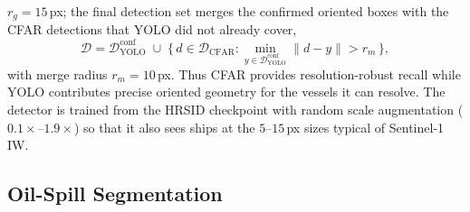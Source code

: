 \documentclass[a4paper,11pt]{article}
\begin{document}
$r_g=15$\,px; the final detection set merges the confirmed oriented boxes with the CFAR
detections that YOLO did not already cover,
\begin{equation}
\mathcal{D} = \mathcal{D}_{\text{YOLO}}^{\text{conf}} \;\cup\;
\{\,d \in \mathcal{D}_{\text{CFAR}} : \min_{y\in\mathcal{D}_{\text{YOLO}}^{\text{conf}}}
\lVert d - y\rVert > r_m\,\},
\end{equation}
with merge radius $r_m=10$\,px. Thus CFAR provides resolution-robust recall while YOLO
contributes precise oriented geometry for the vessels it can resolve. The detector is
trained from the HRSID checkpoint with random scale augmentation ($0.1\times$--$1.9\times$)
so that it also sees ships at the $5$--$15$\,px sizes typical of Sentinel-1 IW.

\subsection{Oil-Spill Segmentation}
\label{subsec:oil}
\end{document}
